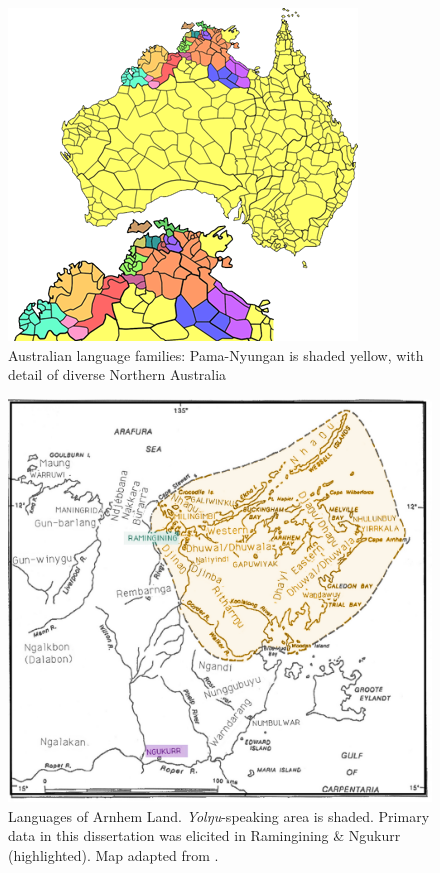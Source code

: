 \documentclass[12pt,dvipsnames]{report}
\begin{document}
\begin{figure}
		\caption[\textsc{map.} Australia \& the top end]{Australian language families: Pama-Nyungan is shaded yellow, with detail of diverse Northern Australia \citep[adapted from][]{Dixon2002a}}\label{pn}\centering
		\includegraphics[width=.6\linewidth]{ALs.png}
	\end{figure}
\begin{figure}
	\caption[\textsc{map.} Languages of Arnhem Land]{Languages of Arnhem Land. \textit{Yolŋu}-speaking area is shaded. Primary data in this dissertation was elicited in Ramingining \& Ngukurr (highlighted). Map adapted from \citet[2]{Wilkinson1991}.}\label{arn}\centering
		\includegraphics[width=.85\linewidth]{arnhem-mw2.png}
\end{figure}
\end{document}

